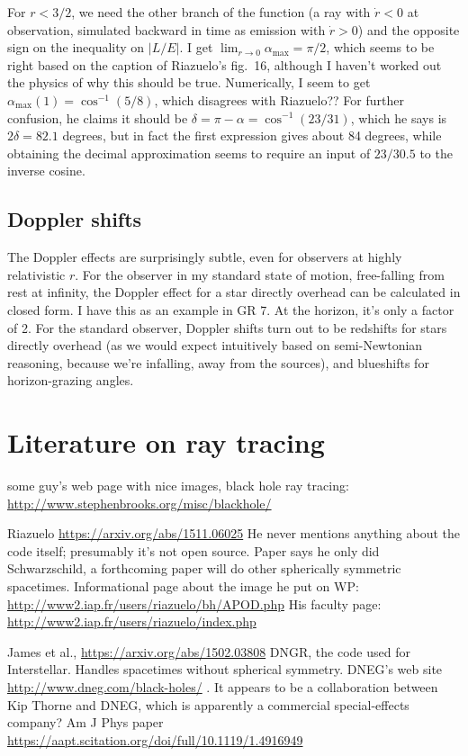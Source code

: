 \documentclass{article}
\begin{document}
For $r<3/2$, we need the other branch of the function 
(a ray with $\dot{r}<0$ at observation, simulated backward in time as emission with $\dot{r}>0$)
and the opposite sign on the inequality on $|L/E|$.
I get $\lim_{r\rightarrow 0}\alpha_\text{max}=\pi/2$,
which seems to be right based on the caption of Riazuelo's fig.~16, although I haven't worked out the
physics of why this should be true. Numerically, I seem to
get $\alpha_\text{max}(1)=\cos^{-1}(5/8)$, which disagrees with
Riazuelo?? For further confusion, he claims it should be $\delta=\pi-\alpha=\cos^{-1}(23/31)$,
which he says is $2\delta=82.1$ degrees, but in fact the first expression gives about 84 degrees,
while obtaining the decimal approximation seems to require an input of $23/30.5$ to the inverse cosine.


\subsection{Doppler shifts}

The Doppler effects are surprisingly subtle, even for observers at highly relativistic $r$.
For the observer in my standard state of motion, free-falling from rest at infinity, the Doppler
effect for a star directly overhead can be calculated in closed form. I have this as an example
in GR 7. At the horizon, it's only a factor of 2. For the standard observer,
Doppler shifts turn out to be redshifts for stars
directly overhead (as we would expect intuitively based on semi-Newtonian reasoning, because
we're infalling, away from the sources), and blueshifts for horizon-grazing angles.

\section{Literature on ray tracing}

some guy's web page with nice images, black hole ray tracing:
\url{http://www.stephenbrooks.org/misc/blackhole/}

Riazuelo
\url{https://arxiv.org/abs/1511.06025} He never mentions anything about the code itself; presumably
it's not open source. Paper says he only did Schwarzschild, a forthcoming paper will
do other spherically symmetric spacetimes.
Informational page about the image he put on WP: \url{http://www2.iap.fr/users/riazuelo/bh/APOD.php}
His faculty page: \url{http://www2.iap.fr/users/riazuelo/index.php}

James et al., \url{https://arxiv.org/abs/1502.03808} DNGR, the code used for Interstellar.
Handles spacetimes without spherical symmetry. DNEG's web site
\url{http://www.dneg.com/black-holes/} . It appears to be a collaboration between Kip Thorne and
DNEG, which is apparently a commercial special-effects company?
Am J Phys paper \url{https://aapt.scitation.org/doi/full/10.1119/1.4916949}
\end{document}
